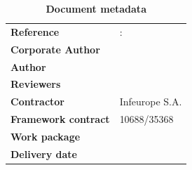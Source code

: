 \clearpage


\setlength{\headheight}{1cm}
\setlength{\footskip}{18mm}
\addtolength{\textheight}{-\footskip}
\pagestyle{empty}

\clearpage



\vspace*{\fill}  

\textbf{\footnotesize \DelPreparation}

\begin{flushleft}
	\begin{table}[!b]
		\caption*{\large\textbf{Document metadata}}
		\footnotesize
		\begin{tabular}{p{3.6cm}p{\textwidth-5cm}}
			\textbf{Reference} 	&   \DelNumber: \DelTitle \\	
			\textbf{Corporate Author}      &   \DelCorporateAuthor \\
			\textbf{Author}             &   \DelAuthor \\
			\textbf{Reviewers}          &   \DelReviewer \\
			\textbf{Contractor}    &   Infeurope S.A. \\
			\textbf{Framework contract}    &   10688/35368 \\		
			\textbf{Work package}  &   \DelNumber\\    			
			\textbf{Delivery date}  &   \DelDate \\    
		\end{tabular}
	\end{table}
\end{flushleft}


\clearpage

\clearpage


\pagestyle{fancy}
\fancyhf{}
\rhead{\slshape{\DelTitle}}
\lhead{\slshape\nouppercase{\rightmark}}
\cfoot{\thepage}



